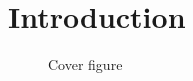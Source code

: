 
\section{Introduction}\label{sec:intro}


\cite{wensing2017proprioceptive}

\begin{figure}
\centering
	\caption{Cover figure}
	\label{fig:cover}
\end{figure}

